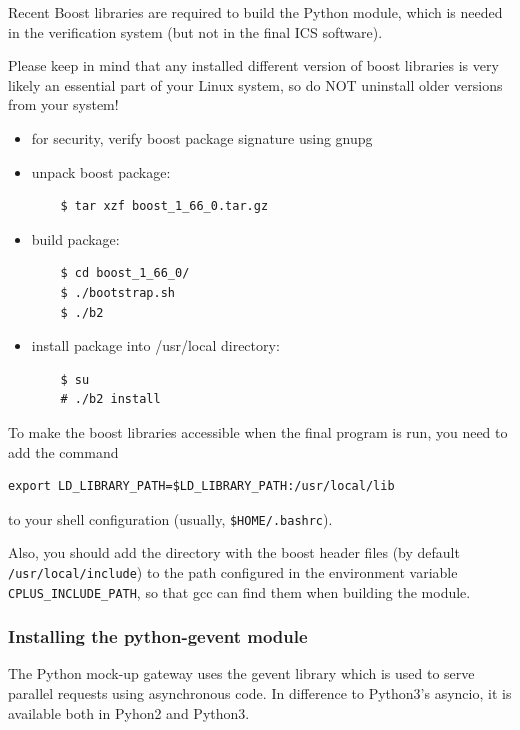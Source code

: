 \documentclass{scrartcl}[12pt,a4paper]
\begin{document}
Recent Boost libraries are required to build the Python module, which
is needed in the verification system (but not in the final ICS
software).

Please keep in mind that any installed different version of boost
libraries is very likely an essential part of your Linux system, so do
NOT uninstall older versions from your system!

\begin{itemize}
\item for security, verify boost package signature using gnupg

\item unpack boost package:
  
  \begin{verbatim}
    $ tar xzf boost_1_66_0.tar.gz
  \end{verbatim}    

\item build package:

  \begin{verbatim}
    $ cd boost_1_66_0/
    $ ./bootstrap.sh
    $ ./b2
  \end{verbatim}    

\item install package into /usr/local directory:

  \begin{verbatim}
    $ su
    # ./b2 install
  \end{verbatim}    
\end{itemize}

To make the boost libraries accessible when the
final program is run, you need to add the
command

\begin{verbatim}
export LD_LIBRARY_PATH=$LD_LIBRARY_PATH:/usr/local/lib
\end{verbatim}

to your shell configuration (usually, \verb+$HOME/.bashrc+).

Also, you should add the directory with the boost header files (by
default \verb+/usr/local/include+) to the path configured in the environment
variable \verb+CPLUS_INCLUDE_PATH+, so that gcc can find them when building
the module.

\subsubsection{Installing the python-gevent module}

The Python mock-up gateway uses the gevent
library which is used to serve parallel requests
using asynchronous code. In difference to
Python3's asyncio, it is available both in
Pyhon2 and Python3.
\end{document}
